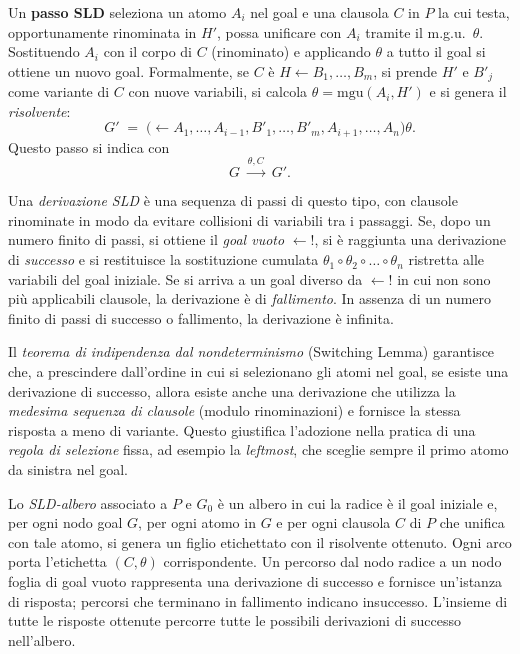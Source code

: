 \documentclass[12pt]{article}
\begin{document}
Un \textbf{passo SLD} seleziona un atomo $A_i$ nel goal e una clausola $C$ in $P$ la cui testa, opportunamente rinominata in $H'$, possa unificare con $A_i$ tramite il m.g.u.\ $\theta$. Sostituendo $A_i$ con il corpo di $C$ (rinominato) e applicando $\theta$ a tutto il goal si ottiene un nuovo goal. Formalmente, se $C$ è $H\leftarrow B_1,\dots,B_m$, si prende $H'$ e $B'_j$ come variante di $C$ con nuove variabili, si calcola $\theta = \mathrm{mgu}(A_i,H')$ e si genera il \emph{risolvente}:
\[
  G' \;=\; \bigl(\leftarrow A_1,\dots,A_{i-1},B'_1,\dots,B'_m,A_{i+1},\dots,A_n \bigr)\theta.
\]
Questo passo si indica con
\[
  G \;\xrightarrow{\theta,C}\; G'.
\]

Una \emph{derivazione SLD} è una sequenza di passi di questo tipo, con clausole rinominate in modo da evitare collisioni di variabili tra i passaggi. Se, dopo un numero finito di passi, si ottiene il \emph{goal vuoto} $\leftarrow !$, si è raggiunta una derivazione di \emph{successo} e si restituisce la sostituzione cumulata $\theta_1\circ\theta_2\circ\dots\circ\theta_n$ ristretta alle variabili del goal iniziale. Se si arriva a un goal diverso da $\leftarrow !$ in cui non sono più applicabili clausole, la derivazione è di \emph{fallimento}. In assenza di un numero finito di passi di successo o fallimento, la derivazione è infinita.

Il \emph{teorema di indipendenza dal nondeterminismo} (Switching Lemma) garantisce che, a prescindere dall'ordine in cui si selezionano gli atomi nel goal, se esiste una derivazione di successo, allora esiste anche una derivazione che utilizza la \emph{medesima sequenza di clausole} (modulo rinominazioni) e fornisce la stessa risposta a meno di variante. Questo giustifica l'adozione nella pratica di una \emph{regola di selezione} fissa, ad esempio la \emph{leftmost}, che sceglie sempre il primo atomo da sinistra nel goal.

Lo \emph{SLD-albero} associato a $P$ e $G_0$ è un albero in cui la radice è il goal iniziale e, per ogni nodo goal $G$, per ogni atomo in $G$ e per ogni clausola $C$ di $P$ che unifica con tale atomo, si genera un figlio etichettato con il risolvente ottenuto. Ogni arco porta l'etichetta $(C,\theta)$ corrispondente. Un percorso dal nodo radice a un nodo foglia di goal vuoto rappresenta una derivazione di successo e fornisce un'istanza di risposta; percorsi che terminano in fallimento indicano insuccesso. L'insieme di tutte le risposte ottenute percorre tutte le possibili derivazioni di successo nell'albero.
\end{document}
